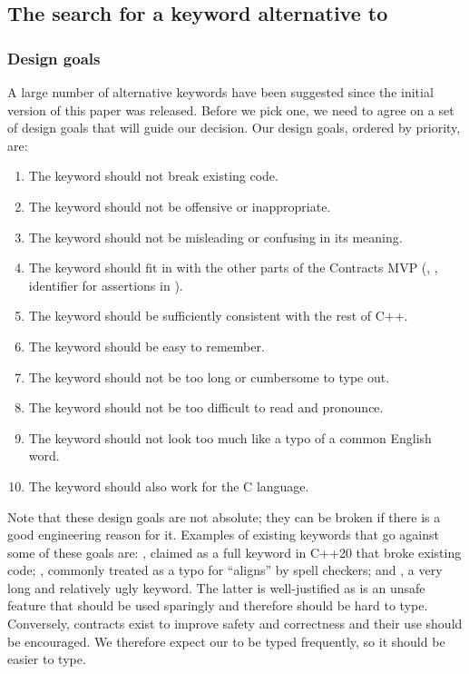 \subsection{The search for a keyword alternative to }
\label{subsec:keyword}

\subsubsection{Design goals}
\label{subsubsec:keyword_goals}
A large number of alternative keywords have been suggested since the initial version of this paper was released. Before we pick one, we need to agree on a set of design goals that will guide our decision. Our design goals, ordered by priority, are:
\begin{enumerate}
\item The keyword should not break existing code.
\item The keyword should not be offensive or inappropriate.
\item The keyword should not be misleading or confusing in its meaning.
\item The keyword should fit in with the other parts of the Contracts MVP (, , identifier for assertions in \mbox{}).
\item The keyword should be sufficiently consistent with the rest of C++.
\item The keyword should be easy to remember.
\item The keyword should not be too long or cumbersome to type out.
\item The keyword should not be too difficult to read and pronounce.
\item The keyword should not look too much like a typo of a common English word.
\item The keyword should also work for the C language.
\end{enumerate}
Note that these design goals are not absolute; they can be broken if there is a good engineering reason for it. Examples of existing keywords that go against some of these goals are: , claimed as a full keyword in C++20 that broke existing code; , commonly treated as a typo for ``aligns'' by spell checkers; and , a very long and relatively ugly keyword. The latter is well-justified as  is an unsafe feature that should be used sparingly and therefore should be hard to type. Conversely, contracts exist to improve safety and correctness and their use should be encouraged. We therefore expect our \emph{} to be typed frequently, so it should be easier to type.

